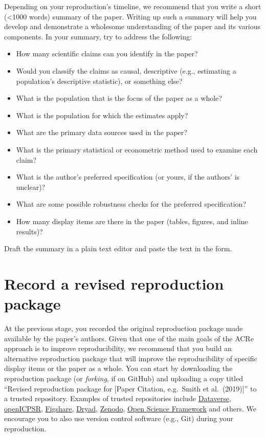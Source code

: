 \documentclass[
]{book}
\providecommand{\tightlist}{%
  \setlength{\itemsep}{0pt}\setlength{\parskip}{0pt}}
\begin{document}
Depending on your reproduction's timeline, we recommend that you write a short (\textless1000 words) summary of the paper. Writing up such a summary will help you develop and demonstrate a wholesome understanding of the paper and its various components. In your summary, try to address the following:

\begin{itemize}
\tightlist
\item
  How many scientific claims can you identify in the paper?
\item
  Would you classify the claims as causal, descriptive (e.g., estimating a population's descriptive statistic), or something else?\\
\item
  What is the population that is the focus of the paper as a whole?\\
\item
  What is the population for which the estimates apply?\\
\item
  What are the primary data sources used in the paper?\\
\item
  What is the primary statistical or econometric method used to examine each claim?\\
\item
  What is the author's preferred specification (or yours, if the authors' is unclear)?\\
\item
  What are some possible robustness checks for the preferred specification?\\
\item
  How many display items are there in the paper (tables, figures, and inline results)?
\end{itemize}

Draft the summary in a plain text editor and paste the text in the form.

\hypertarget{record-a-revised-reproduction-package}{%
\section{Record a revised reproduction package}\label{record-a-revised-reproduction-package}}

At the previous stage, you recorded the original reproduction package made available by the paper's authors. Given that one of the main goals of the ACRe approach is to improve reproducibility, we recommend that you build an alternative reproduction package that will improve the reproducibility of specific display items or the paper as a whole.
You can start by downloading the reproduction package (or \emph{forking}, if on GitHub) and uploading a copy titled ``Revised reproduction package for {[}Paper Citation, e.g.~Smith et al.~(2019){]}'' to a trusted repository. Examples of trusted repositories include \href{https://dataverse.org/}{Dataverse}, \href{https://www.openicpsr.org/openicpsr/}{openICPSR}, \href{https://figshare.com}{Figshare}, \href{https://datadryad.org/stash}{Dryad}, \href{https://about.zenodo.org/}{Zenodo}, \href{osf.io/}{Open Science Framework} and others. We encourage you to also use version control software (e.g., Git) during your reproduction.
\end{document}
